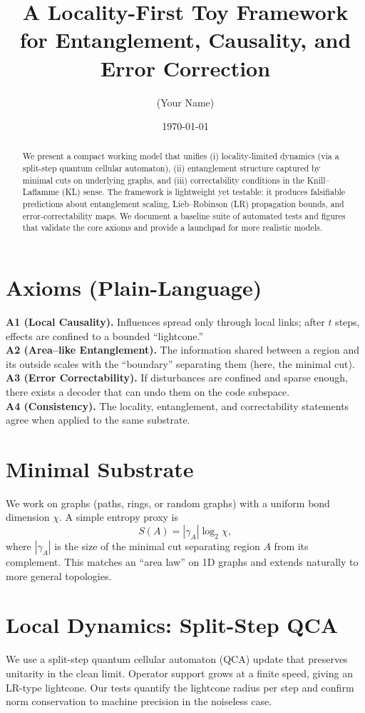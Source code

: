 \documentclass[11pt]{article}
\title{A Locality-First Toy Framework for Entanglement, Causality, and Error Correction}
\author[1]{(Your Name)}
\affil[1]{Independent Researcher}
\date{\today}
\begin{document}
\maketitle

\begin{abstract}
We present a compact working model that unifies (i) locality-limited dynamics (via a split-step quantum cellular automaton), (ii) entanglement structure captured by minimal cuts on underlying graphs, and (iii) correctability conditions in the Knill--Laflamme (KL) sense. The framework is lightweight yet testable: it produces falsifiable predictions about entanglement scaling, Lieb--Robinson (LR) propagation bounds, and error-correctability maps. We document a baseline suite of automated tests and figures that validate the core axioms and provide a launchpad for more realistic models.
\end{abstract}

\section{Axioms (Plain-Language)}
\textbf{A1 (Local Causality).} Influences spread only through local links; after $t$ steps, effects are confined to a bounded ``lightcone.'' \\
\textbf{A2 (Area--like Entanglement).} The information shared between a region and its outside scales with the ``boundary'' separating them (here, the minimal cut). \\
\textbf{A3 (Error Correctability).} If disturbances are confined and sparse enough, there exists a decoder that can undo them on the code subspace. \\
\textbf{A4 (Consistency).} The locality, entanglement, and correctability statements agree when applied to the same substrate.

\section{Minimal Substrate}
We work on graphs (paths, rings, or random graphs) with a uniform bond dimension $\chi$. A simple entropy proxy is
\[
S(A) = |\gamma_A| \log_2 \chi,
\]
where $|\gamma_A|$ is the size of the minimal cut separating region $A$ from its complement. This matches an ``area law'' on 1D graphs and extends naturally to more general topologies.

\section{Local Dynamics: Split-Step QCA}
We use a split-step quantum cellular automaton (QCA) update that preserves unitarity in the clean limit. Operator support grows at a finite speed, giving an LR-type lightcone. Our tests quantify the lightcone radius per step and confirm norm conservation to machine precision in the noiseless case.
\end{document}
